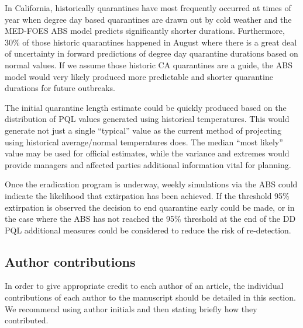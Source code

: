 \documentclass[10pt,a4paper,twocolumn]{article}
\begin{document}
In California, historically quarantines have most frequently occurred at times of year when 
degree day based quarantines are drawn out by cold weather and the MED-FOES ABS model predicts significantly
shorter durations.
Furthermore, 30\% of those historic quarantines happened in August where there is a great 
deal of uncertainty in forward predictions of degree day quarantine durations based on normal values.
If we assume those historic CA quarantines are a guide, the ABS model would very likely
produced more predictable and shorter quarantine durations for future outbreaks.





The initial quarantine length estimate could be quickly produced based on the distribution of PQL values
generated using historical temperatures.
This would generate not just a single ``typical'' value as the current method of projecting
using historical average/normal temperatures does.
The median ``most likely'' value may be used for official estimates, while
the variance and extremes would provide managers and affected parties additional
information vital for planning.

Once the eradication program is underway, weekly simulations
via the ABS could indicate the likelihood that extirpation has been achieved. If the threshold 
95\% extirpation is observed the decision to end quarantine early could be made, or in the case 
where the ABS has not reached the 95\% threshold at the end of the DD PQL additional measures could 
be considered to reduce the risk of re-detection.





\subsection*{Author contributions}
In order to give appropriate credit to each author of an article, the individual
contributions of each author to the manuscript should be detailed in this section. We
recommend using author initials and then stating briefly how they contributed.
\end{document}
